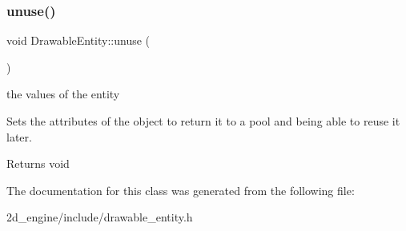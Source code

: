 \subsubsection{\texorpdfstring{unuse()}{unuse()}}
{\footnotesize\ttfamily void Drawable\+Entity\+::unuse (\begin{DoxyParamCaption}{ }\end{DoxyParamCaption})}

the values of the entity

Sets the attributes of the object to return it to a pool and being able to reuse it later.

\begin{DoxyReturn}{Returns}
void 
\end{DoxyReturn}


The documentation for this class was generated from the following file\+:\begin{DoxyCompactItemize}
\item 
2d\+\_\+engine/include/drawable\+\_\+entity.\+h\end{DoxyCompactItemize}
